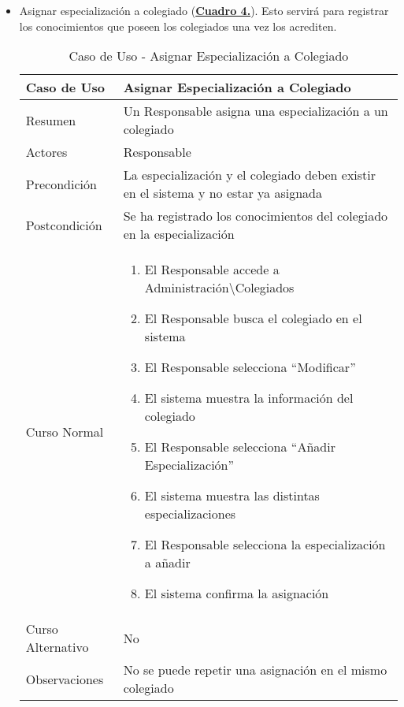 \begin{itemize}
  \newpage~
	\item \addtocounter{tabla}{1} Asignar especialización a colegiado (\textbf{\hyperref[tab:curAsignarEspecColeg]{Cuadro 4.}}). Esto servirá para registrar los conocimientos que poseen los colegiados una vez los acrediten.
		\begin{table}[!htbp]
		  \centering  \addtocounter{casouso}{1}
		  \begin{tabular}{|l | p{100mm}|}
		    \textbf{Caso de Uso}  & \textbf{Asignar Especialización a Colegiado} \\ \hline
		    Resumen 		 & Un Responsable asigna una especialización a un colegiado \\ \hline
		    Actores  		 & Responsable \\ \hline
		    Precondición  	 & La especialización y el colegiado deben existir en el sistema y no estar ya asignada  \\ \hline
		    Postcondición  	 & Se ha registrado los conocimientos del colegiado en la especialización \\ \hline
		    Curso Normal   	 & \begin{enumerate}
			  \item El Responsable accede a Administración\textbackslash Colegiados
			  \item El Responsable busca el colegiado en el sistema
			  \item El Responsable selecciona ``Modificar''
			  \item El sistema muestra la información del colegiado
			  \item El Responsable selecciona ``Añadir Especialización''
			  \item El sistema muestra las distintas especializaciones
			  \item El Responsable selecciona la especialización a añadir
			  \item El sistema confirma la asignación
		    \end{enumerate}  \\ \hline
		    Curso Alternativo  & No  \\ \hline
		    Observaciones 	 & No se puede repetir una asignación en el mismo colegiado  \\ \hline
		  \end{tabular}
		  \caption{Caso de Uso  - Asignar Especialización a Colegiado}
		  \label{tab:curAsignarEspecColeg}
		\end{table}
		\FloatBarrier
	

\end{itemize}
